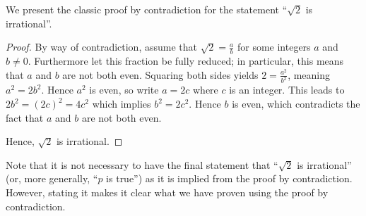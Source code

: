 \begin{example}\label{example:sqrt2-is-irrational}
    \setlength{\parindent}{1.5em}

    We present the classic proof by contradiction for the statement ``$\sqrt 2$ is irrational''.
    \begin{proof}
        By way of contradiction, assume that $\sqrt2 = \frac ab$ for some integers $a$ and $b \neq 0$. Furthermore let this fraction be fully reduced; in particular, this means that $a$ and $b$ are not both even. Squaring both sides yields $2 = \frac{a^2}{b^2}$, meaning  $a^2 = 2b^2$. Hence $a^2$ is even, so write $a = 2c$ where $c$ is an integer. This leads to $2b^2 = (2c)^2 = 4c^2$ which implies $b^2 = 2c^2$. Hence $b$ is even, which contradicts the fact that $a$ and $b$ are not both even.

        Hence, $\sqrt 2$ is irrational.
    \end{proof}
\end{example}

Note that it is not necessary to have the final statement that ``$\sqrt 2$ is irrational'' (or, more generally, ``$p$ is true'') as it is implied from the proof by contradiction. However, stating it makes it clear what we have proven using the proof by contradiction.

